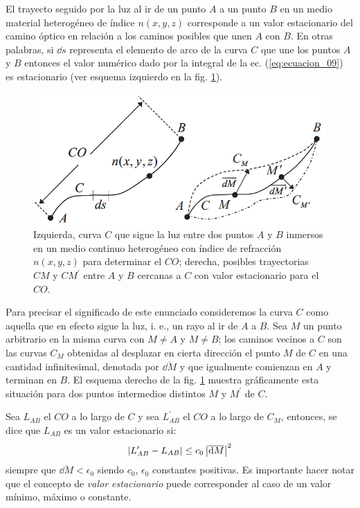 \documentclass[14pt]{extarticle}
\begin{document}
El trayecto seguido por la luz al ir de un punto $A$ a un punto $B$ en un medio material heterogéneo de índice $n(x, y, z)$ corresponde a un valor estacionario del camino óptico en relación a los caminos posibles que unen $A$ con $B$. En otras palabras, si $\dd{s}$ representa el elemento de arco de la curva $C$ que une los puntos $A$ y $B$ entonces el valor numérico dado por la integral de la ec. (\ref{eq:ecuacion_09}) es estacionario (ver esquema izquierdo en la fig. \ref{fig:figura_02}).
\begin{figure}[H]
    \centering
    \includegraphics[scale=0.75]{Imagenes/Optica_Geometrica_02.png}
    \caption{Izquierda, curva $C$ que sigue la luz entre dos puntos $A$ y $B$ inmersos en un medio continuo heterogéneo con índice de refracción $n(x, y, z)$ para determinar el $CO$; derecha, posibles trayectorias $CM$ y $CM^{\prime}$ entre $A$ y $B$ cercanas a $C$ con valor estacionario para el $CO$.}
    \label{fig:figura_02}
\end{figure}
Para precisar el significado de este enunciado consideremos la curva $C$ como aquella que en efecto sigue la luz, i. e., un rayo al ir de $A$ a $B$. Sea $M$ un punto arbitrario en la misma curva con $M \neq A$ y $M \neq B$; los caminos vecinos a $C$ son las curvas $C_{M}$ obtenidas al desplazar en cierta dirección el punto $M$ de $C$ en una cantidad infinitesimal, denotada por $\overline{\dd{M}}$ y que igualmente comienzan en $A$ y terminan en $B$. El esquema derecho de la fig. \ref{fig:figura_02} muestra gráficamente esta situación para dos puntos intermedios distintos $M$ y $M^{\prime}$ de $C$. 

Sea $L_{AB}$ el $CO$ a lo largo de $C$ y sea $L_{AB}^{\prime}$ el $CO$ a lo largo de $C_{M}$, entonces, se dice que $L_{AB}$ es un valor estacionario si:
\begin{align*}
\abs{L_{AB}^{\prime} - L_{AB}} \leq c_{0} \, \abs{\overline{\dd{M}}}^{2}
\end{align*}
siempre que $\overline{\dd{M}} < \epsilon_{0}$ siendo $c_{0}$, $\epsilon_{0}$ constantes positivas. Es importante hacer notar que el concepto de \textit{valor estacionario} puede corresponder al caso de un valor mínimo, máximo o constante.
\end{document}
